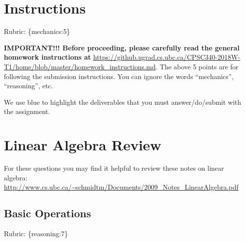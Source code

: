 \documentclass{article}
\def\rubric#1{\gre{Rubric: \{#1\}}}{}
\def\blu#1{{\color{blu}#1}}
\def\gre#1{{\color{gre}#1}}
\begin{document}
\section*{Instructions}
\rubric{mechanics:5}

\textbf{IMPORTANT!!! Before proceeding, please carefully read the general homework instructions at} \url{https://github.ugrad.cs.ubc.ca/CPSC340-2018W-T1/home/blob/master/homework_instructions.md}. The above 5 points are for following the submission instructions. You can ignore the words ``mechanics'', ``reasoning'', etc.

\vspace{1em}
We use \blu{blue} to highlight the deliverables that you must answer/do/submit with the assignment.

\section{Linear Algebra Review}

For these questions you may find it helpful to review these notes on linear algebra:\\
\url{http://www.cs.ubc.ca/~schmidtm/Documents/2009_Notes_LinearAlgebra.pdf}

\subsection{Basic Operations}
\rubric{reasoning:7}
\end{document}
